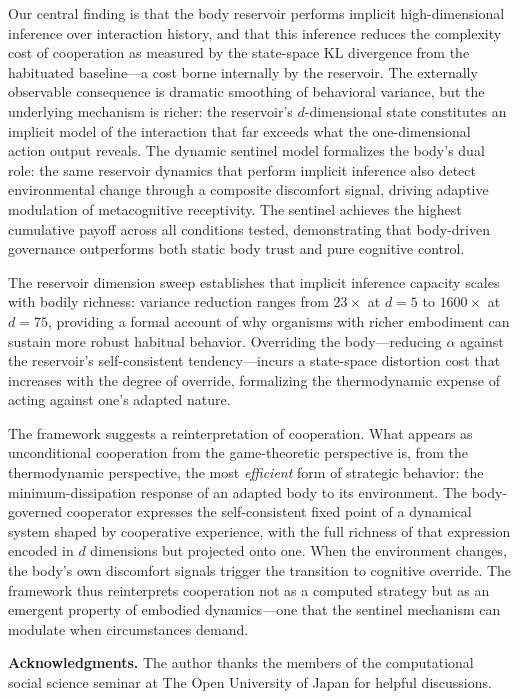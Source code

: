 \documentclass[11pt,a4paper]{article}
\theoremstyle{definition}
\begin{document}
Our central finding is that the body reservoir performs implicit
high-dimensional inference over interaction history, and that this
inference reduces the complexity cost of cooperation as measured by the
state-space KL divergence from the habituated baseline---a cost borne
internally by the reservoir.
The externally observable consequence is dramatic smoothing of behavioral
variance, but the underlying mechanism is richer: the reservoir's
$d$-dimensional state constitutes an implicit model of the interaction
that far exceeds what the one-dimensional action output reveals.
The dynamic sentinel model formalizes the body's dual role: the same
reservoir dynamics that perform implicit inference also detect
environmental change through a composite discomfort signal, driving
adaptive modulation of metacognitive receptivity.  The sentinel achieves
the highest cumulative payoff across all conditions tested, demonstrating
that body-driven governance outperforms both static body trust and pure
cognitive control.

The reservoir dimension sweep establishes that implicit inference capacity
scales with bodily richness: variance reduction ranges from $23\times$ at
$d = 5$ to $1600\times$ at $d = 75$, providing a formal account of why
organisms with richer embodiment can sustain more robust habitual behavior.
Overriding the body---reducing $\alpha$ against the reservoir's
self-consistent tendency---incurs a state-space distortion cost that
increases with the degree of override, formalizing the thermodynamic
expense of acting against one's adapted nature.

The framework suggests a reinterpretation of cooperation.  What appears
as unconditional cooperation from the game-theoretic perspective is, from
the thermodynamic perspective, the most \emph{efficient} form of strategic
behavior: the minimum-dissipation response of an adapted body to its
environment.  The body-governed cooperator expresses the self-consistent
fixed point of a dynamical system shaped by cooperative experience,
with the full richness of that expression encoded in $d$ dimensions
but projected onto one.  When the environment changes, the body's own
discomfort signals trigger the transition to cognitive override.
The framework thus reinterprets cooperation not as a computed strategy
but as an emergent property of embodied dynamics---one that the
sentinel mechanism can modulate when circumstances demand.

\bigskip
\noindent\textbf{Acknowledgments.}
The author thanks the members of the computational social science seminar
at The Open University of Japan for helpful discussions.



\end{document}
